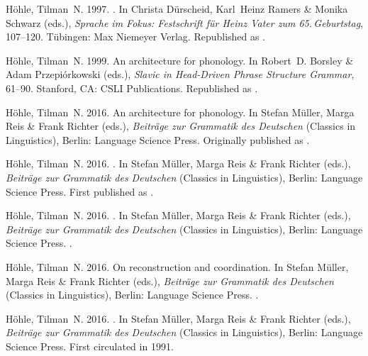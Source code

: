 \begin{thebibliography}{1420}
H{\"o}hle, Tilman~N. 1997.
.
\newblock In Christa D{\"u}rscheid, Karl~Heinz Ramers \& Monika Schwarz (eds.),
  \emph{{Sprache im Fokus: Festschrift f{\"u}r Heinz Vater zum
  65.\,Geburtstag}}, 107--120. T{\"u}bingen: Max Niemeyer Verlag.
\newblock Republished as .

H{\"o}hle, Tilman~N. 1999.
\newblock An architecture for phonology.
\newblock In Robert~D. Borsley \& Adam Przepi{\'o}rkowski (eds.), \emph{Slavic
  in {Head-Driven Phrase Structure Grammar}}, 61--90. Stanford, CA: CSLI
  Publications.
\newblock Republished as .

H{\"o}hle, Tilman~N. 2016{}.
\newblock An architecture for phonology.
\newblock In Stefan M{\"u}ller, Marga Reis \& Frank Richter (eds.),
  \emph{{Beitr{\"a}ge zur Grammatik des Deutschen}}  (Classics in Linguistics),
  Berlin: Language Science Press.
\newblock Originally published as .

H{\"o}hle, Tilman~N. 2016{}.
.
\newblock In Stefan M{\"u}ller, Marga Reis \& Frank Richter (eds.),
  \emph{{Beitr{\"a}ge zur Grammatik des Deutschen}}  (Classics in Linguistics),
  Berlin: Language Science Press.
\newblock First published as .

H{\"o}hle, Tilman~N. 2016{}.
.
\newblock In Stefan M{\"u}ller, Marga Reis \& Frank Richter (eds.),
  \emph{{Beitr{\"a}ge zur Grammatik des Deutschen}}  (Classics in Linguistics),
  Berlin: Language Science Press.
\newblock \inPreparation.

H{\"o}hle, Tilman~N. 2016{}.
\newblock On reconstruction and coordination.
\newblock In Stefan M{\"u}ller, Marga Reis \& Frank Richter (eds.),
  \emph{{Beitr{\"a}ge zur Grammatik des Deutschen}}  (Classics in Linguistics),
  Berlin: Language Science Press.
\newblock \inPreparation.

H{\"o}hle, Tilman~N. 2016{}.
.
\newblock In Stefan M{\"u}ller, Marga Reis \& Frank Richter (eds.),
  \emph{{Beitr{\"a}ge zur Grammatik des Deutschen}}  (Classics in Linguistics),
  Berlin: Language Science Press.
\newblock First circulated in 1991.


\end{thebibliography}
